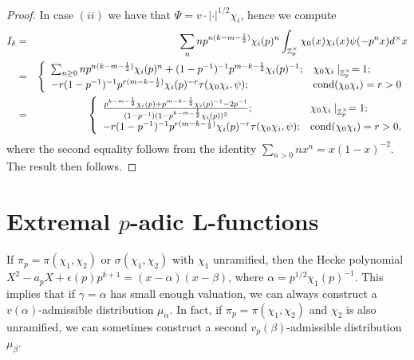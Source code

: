 \documentclass{amsart}
\newcommand{\Z}{{\mathbb Z}}
\begin{document}
\begin{proof}
In case $(ii)$ we have that $\Psi=v\cdot|\cdot|^{1/2}\chi_i$, hence
we compute 
\begin{eqnarray*}
I_\delta&=&\sum_nnp^{n(k-m-\frac{1}{2})}\chi_i(p)^n\int_{\Z_p^\times}\chi_0(x)\chi_i(x)\psi(-p^nx)d^\times x\\
&=&\left\{\begin{array}{ll}
\sum_{n\geq0}np^{n(k-m-\frac{1}{2})}\chi_i(p)^n+(1-p^{-1})^{-1}p^{m-k-\frac{1}{2}}\chi_i(p)^{-1};&\chi_0\chi_i\mid_{\Z_p^\times}=1;\\
-r(1-p^{-1})^{-1}p^{r(m-k-\frac{1}{2})}\chi_i(p)^{-r}\tau(\chi_0\chi_i,\psi);&{\rm cond}(\chi_0\chi_i)=r>0
\end{array}\right.\\
&=&\left\{\begin{array}{ll}
\frac{p^{k-m-\frac{1}{2}}\chi_i(p)+p^{m-k-\frac{1}{2}}\chi_i(p)^{-1}-2p^{-1}}{(1-p^{-1})(1-p^{k-m-\frac{1}{2}}\chi_i(p))^2};&\chi_0\chi_i\mid_{\Z_p^\times}=1;\\
-r(1-p^{-1})^{-1}p^{r(m-k-\frac{1}{2})}\chi_i(p)^{-r}\tau(\chi_0\chi_i,\psi);&{\rm cond}(\chi_0\chi_i)=r>0,
\end{array}\right.
\end{eqnarray*}
where the second equality follows from the identity $\sum_{n>0}nx^n=x(1-x)^{-2}$.
The result then follows.
\end{proof}




\section{Extremal $p$-adic L-functions}


If $\pi_p=\pi(\chi_1,\chi_2)$ or $\sigma(\chi_1,\chi_2)$ with $\chi_1$ unramified, then the Hecke polynomial $X^2-a_pX+\epsilon(p)p^{k+1}=(x-\alpha)(x-\beta)$, where $\alpha=p^{1/2}\chi_1(p)^{-1}$. This implies that if $\gamma=\alpha$ has small enough valuation, we can always construct a $v(\alpha)$-admissible distribution $\mu_\alpha$. In fact, if $\pi_p=\pi(\chi_1,\chi_2)$ and $\chi_2$ is also unramified, we can sometimes construct a second $v_p(\beta)$-admissible distribution $\mu_\beta$. 
\end{document}
